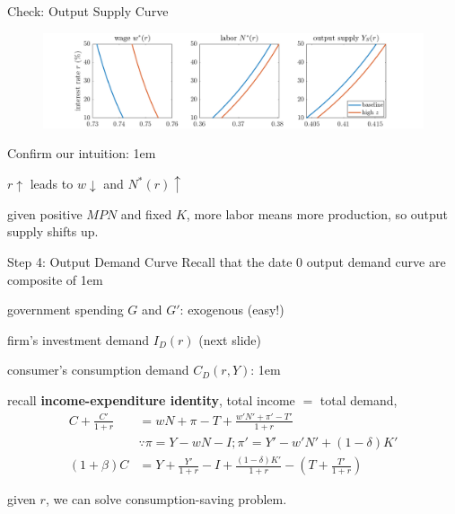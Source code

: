 \documentclass[11pt,aspectratio=43]{beamer}
\let\olditemize=\itemize
\let\endolditemize=\enditemize
\renewenvironment{itemize}{\olditemize \itemsep1em}{\endolditemize}
\theoremstyle{definition}
\begin{document}
\begin{frame}{Check: Output Supply Curve}
\label{slide:Check__Output_Supply_Curve}
    \begin{figure}
        \includegraphics[width=\textwidth]{./figures/OutputSupply.png}
    \end{figure}
    Confirm our intuition:
    \begin{itemize}
        \item $ r \uparrow  $ leads to $ w \downarrow  $ and $ N^{*}( r ) \uparrow  $
        \item given positive $ MPN $ and fixed $ K $, more labor means more production, so output supply shifts up.
    \end{itemize}
\end{frame}

\begin{frame}{Step 4: Output Demand Curve}
\label{slide:Step_4__Output_Demand_Curve}
    Recall that the date 0 output demand curve are composite of
    \begin{itemize}
        \item government spending $ G $ and $ G' $: exogenous (easy!)
        \item firm's investment demand $ I_{D}( r ) $ (next slide)
        \item consumer's consumption demand $ C_{D}( r, Y ) $:
        \begin{itemize}
            \item recall \textbf{income-expenditure identity}, total income $ = $ total demand,
            \begin{align*}
                C + \frac{C'}{1+r}
                    &  = wN + \pi - T + \frac{w' N' + \pi' - T'}{1+r}
                \\
                    & \because \pi = Y - wN - I; \pi' = Y' - w'N' + ( 1-\delta )K'
                \\
                ( 1+\beta ) C
                    & = Y + \frac{Y'}{1+r} - I + \frac{( 1-\delta )K'}{1+r} - \left( T + \frac{T'}{1+r} \right)
            \end{align*}
            \item given $ r $, we can solve consumption-saving problem.
        \end{itemize}
    \end{itemize}
\end{frame}
\end{document}
